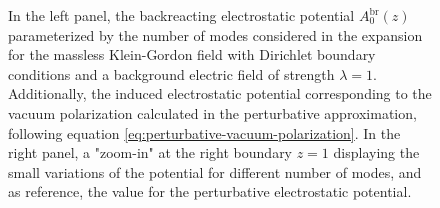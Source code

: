 \begin{figure}
\begin{subfigure}{0.5\textwidth}
\end{subfigure}
\caption{In the left panel, the backreacting electrostatic potential $A_0^\text{br}(z)$ parameterized by the number of modes considered in the expansion for the massless Klein-Gordon field with Dirichlet boundary conditions and a background electric field of strength $\lambda=1$.
Additionally, the induced electrostatic potential corresponding to the vacuum polarization calculated in the perturbative approximation, following equation \eqref{eq:perturbative-vacuum-polarization}. In the right panel, a "zoom-in" at the right boundary $z=1$ displaying the small variations of the potential for different number of modes, and as reference, the value for the perturbative electrostatic potential.}
\label{fig:A0-mode-dependence}
\end{figure}